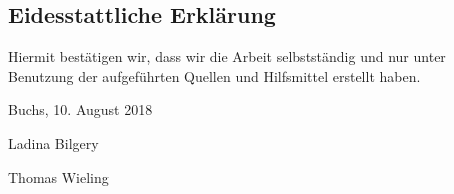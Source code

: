 \begin{titlepage}


\begin{flushleft}
\section*{Eidesstattliche Erklärung}
Hiermit bestätigen wir, dass wir die Arbeit selbstständig und nur unter Benutzung der aufgeführten Quellen und Hilfsmittel erstellt haben.

\vspace{25mm}

Buchs, 10. August 2018
\end{flushleft}

\vspace{25mm}

\begin{minipage}[t]{0.5\textwidth}
  	\begin{flushleft}
  		\vspace{0pt}
      Ladina Bilgery
  	\end{flushleft}
\end{minipage} %
\begin{minipage}[t]{0.5\textwidth}
	\begin{flushleft}
		\vspace{0pt}
    Thomas Wieling
	\end{flushleft}
\end{minipage}


\thispagestyle{empty}
\end{titlepage}
\restoregeometry
